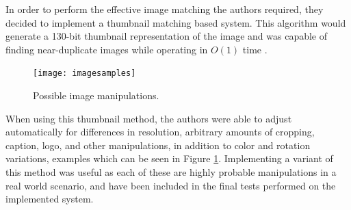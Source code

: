 In order to perform the effective image matching the authors required, they decided to implement a thumbnail matching based system. This algorithm would generate a 130-bit thumbnail representation of the image and was capable of finding near-duplicate images while operating in $O(1)$ time \cite{Srinivasan:2008}.

\begin{figure}[htbp]
\centering
\texttt{[image: imagesamples]}
\caption{Possible image manipulations.}
\label{imgsample}
\end{figure}

When using this thumbnail method, the authors were able to adjust automatically for differences in resolution, arbitrary amounts of cropping, caption, logo, and other manipulations, in addition to color and rotation variations, examples which can be seen in Figure \ref{imgsample}. Implementing a variant of this method was useful as each of these are highly probable manipulations in a real world scenario, and have been included in the final tests performed on the implemented system.

